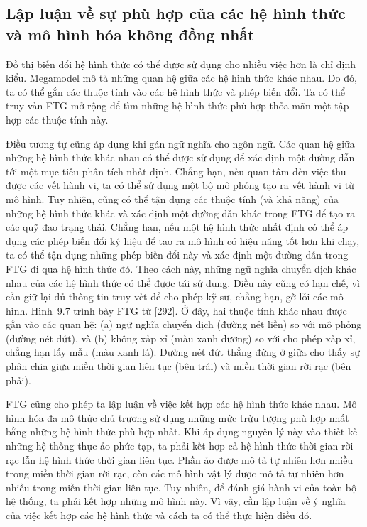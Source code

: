 \subsection{Lập luận về sự phù hợp của các hệ hình thức và mô hình hóa không đồng nhất}
Đồ thị biến đổi hệ hình thức có thể được sử dụng cho nhiều việc hơn là chỉ định kiểu. Megamodel mô tả những quan hệ giữa các hệ hình thức khác nhau. Do đó, ta có thể gắn các thuộc tính vào các hệ hình thức và phép biến đổi. Ta có thể truy vấn FTG mở rộng để tìm những hệ hình thức phù hợp thỏa mãn một tập hợp các thuộc tính này.

Điều tương tự cũng áp dụng khi gán ngữ nghĩa cho ngôn ngữ. Các quan hệ giữa những hệ hình thức khác nhau có thể được sử dụng để xác định một đường dẫn tới một mục tiêu phân tích nhất định. Chẳng hạn, nếu quan tâm đến việc thu được các vết hành vi, ta có thể sử dụng một bộ mô phỏng tạo ra vết hành vi từ mô hình. Tuy nhiên, cũng có thể tận dụng các thuộc tính (và khả năng) của những hệ hình thức khác và xác định một đường dẫn khác trong FTG để tạo ra các quỹ đạo trạng thái. Chẳng hạn, nếu một hệ hình thức nhất định có thể áp dụng các phép biến đổi ký hiệu để tạo ra mô hình có hiệu năng tốt hơn khi chạy, ta có thể tận dụng những phép biến đổi này và xác định một đường dẫn trong FTG đi qua hệ hình thức đó. Theo cách này, những ngữ nghĩa chuyển dịch khác nhau của các hệ hình thức có thể được tái sử dụng. Điều này cũng có hạn chế, vì cần giữ lại đủ thông tin truy vết để cho phép kỹ sư, chẳng hạn, gỡ lỗi các mô hình. Hình~9.7 trình bày FTG từ [292]. Ở đây, hai thuộc tính khác nhau được gắn vào các quan hệ: (a) ngữ nghĩa chuyển dịch (đường nét liền) so với mô phỏng (đường nét đứt), và (b) không xấp xỉ (màu xanh dương) so với cho phép xấp xỉ, chẳng hạn lấy mẫu (màu xanh lá). Đường nét đứt thẳng đứng ở giữa cho thấy sự phân chia giữa miền thời gian liên tục (bên trái) và miền thời gian rời rạc (bên phải).

FTG cũng cho phép ta lập luận về việc kết hợp các hệ hình thức khác nhau. Mô hình hóa đa mô thức chủ trương sử dụng những mức trừu tượng phù hợp nhất bằng những hệ hình thức phù hợp nhất. Khi áp dụng nguyên lý này vào thiết kế những hệ thống thực-ảo phức tạp, ta phải kết hợp cả hệ hình thức thời gian rời rạc lẫn hệ hình thức thời gian liên tục. Phần ảo được mô tả tự nhiên hơn nhiều trong miền thời gian rời rạc, còn các mô hình vật lý được mô tả tự nhiên hơn nhiều trong miền thời gian liên tục. Tuy nhiên, để
đánh giá hành vi của toàn bộ hệ thống, ta phải kết hợp những mô hình này. Vì vậy, cần lập luận về ý nghĩa của việc kết hợp các hệ hình thức và cách ta có thể thực hiện điều đó.


